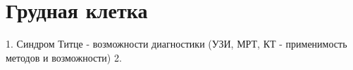 \section{Грудная клетка}
1. Синдром Титце - возможности диагностики (УЗИ, МРТ, КТ - применимость методов и возможности)
2. 